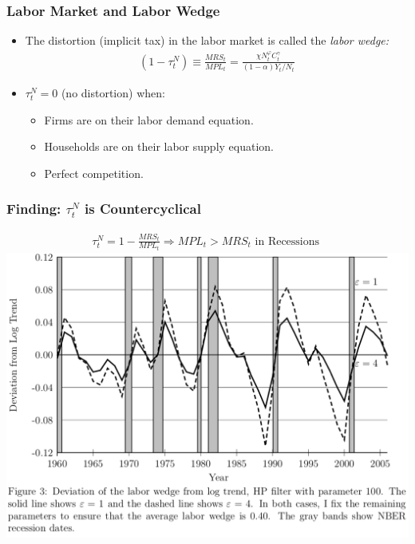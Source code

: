 \documentclass[english,xcolor=svgnames]{beamer}
\begin{document}
 
\begin{frame}
\frametitle{Labor Market and Labor Wedge
}
\begin{itemize}
	\item The distortion (implicit tax) in the labor market is called the \emph{labor wedge:}
	\begin{align*}
		(1-\tau_t^N)\equiv\frac{MRS_t}{MPL_t}=\frac{\chi N_t^\varphi C_t^{\gamma}}{(1-\alpha)Y_t/N_t}
	\end{align*}
	\item $\tau_t^N=0$ (no distortion) when:
	\begin{itemize}
		\item Firms are on their labor demand equation.
		\item Households are on their labor supply equation.
		\item Perfect competition.
	\end{itemize}
\end{itemize}

\end{frame}


\begin{frame}
\frametitle{Finding: $\tau_t^N$ is Countercyclical}
	\begin{align*}
		\tau_t^N = 1- \frac{MRS_t}{MPL_t} \Rightarrow MPL_t>MRS_t \text{ in Recessions }
	\end{align*}
	\centering
	\includegraphics[scale=0.5]{../../Images/Shimer2009laborwedge.png}
\end{frame}
\end{document}

